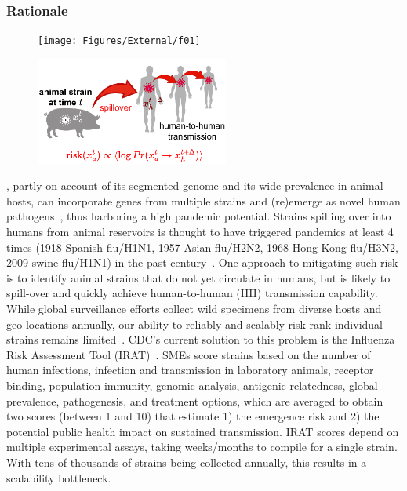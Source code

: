 \documentclass[onecolumn, compsoc,12pt]{IEEEtran}
\begin{document}
\subsubsection*{Rationale}
\begin{figure}
  \hspace{-15pt}\texttt{[image: Figures/External/f01]}

  \vspace{-10pt}
  
  \hspace{-5pt}\includegraphics[width=2.5in]{Figures/External/f02}
  \vspace{-12pt}
  
  \label{fig0}
\end{figure}
\infl, partly on account of its segmented genome and its wide prevalence in animal hosts, can incorporate genes from multiple strains and (re)emerge as novel human pathogens~\cite{reid2003origin,dos2016influenza}, thus harboring  a high pandemic potential. Strains spilling over into humans from animal reservoirs is thought to have triggered  pandemics  at least 4 times (1918 Spanish flu/H1N1, 1957 Asian flu/H2N2, 1968 Hong Kong flu/H3N2, 2009 swine flu/H1N1) in the past century~\cite{shao2017evolution}. One  approach to mitigating such risk is to identify  animal strains  that do not yet circulate in humans, but is likely to spill-over and quickly achieve human-to-human (HH) transmission capability. While global surveillance efforts collect wild specimens from diverse hosts and geo-locations annually, our  ability to reliably and scalably  risk-rank individual strains remains limited~\cite{wille2021accurately}. CDC's current solution to this problem is the Influenza Risk Assessment Tool (IRAT)~\cite{Influenz24:online}.  SMEs
  score strains based on  the number of  human infections, infection and transmission in laboratory animals, receptor binding, population immunity, genomic analysis, antigenic relatedness, global prevalence,  pathogenesis, and  treatment options, which are averaged to obtain two scores (between 1 and 10) that  estimate 1) the emergence  risk and 2) the potential public health impact on sustained transmission. IRAT scores  depend on multiple experimental assays,  taking  weeks/months to compile for a single strain. With tens of   thousands of strains being collected annually, this results in  a scalability bottleneck.
\end{document}
